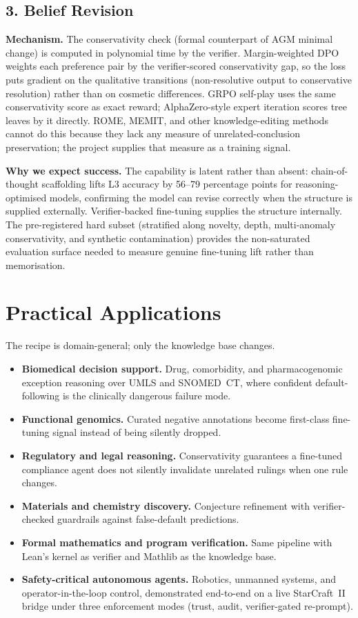 \documentclass[11pt]{article}
\begin{document}
\subsection*{3. Belief Revision}

\textbf{Mechanism.} The conservativity check (formal counterpart of AGM minimal change) is computed in polynomial time by the verifier. Margin-weighted DPO weights each preference pair by the verifier-scored conservativity gap, so the loss puts gradient on the qualitative transitions (non-resolutive output to conservative resolution) rather than on cosmetic differences. GRPO self-play uses the same conservativity score as exact reward; AlphaZero-style expert iteration scores tree leaves by it directly. ROME, MEMIT, and other knowledge-editing methods cannot do this because they lack any measure of unrelated-conclusion preservation; the project supplies that measure as a training signal.

\textbf{Why we expect success.} The capability is latent rather than absent: chain-of-thought scaffolding lifts L3 accuracy by 56--79 percentage points for reasoning-optimised models, confirming the model can revise correctly when the structure is supplied externally. Verifier-backed fine-tuning supplies the structure internally. The pre-registered hard subset (stratified along novelty, depth, multi-anomaly conservativity, and synthetic contamination) provides the non-saturated evaluation surface needed to measure genuine fine-tuning lift rather than memorisation.

\section*{Practical Applications}

The recipe is domain-general; only the knowledge base changes.

\begin{itemize}[nosep, leftmargin=1.4em]
    \item \textbf{Biomedical decision support.} Drug, comorbidity, and pharmacogenomic exception reasoning over UMLS and SNOMED~CT, where confident default-following is the clinically dangerous failure mode.
    \item \textbf{Functional genomics.} Curated negative annotations become first-class fine-tuning signal instead of being silently dropped.
    \item \textbf{Regulatory and legal reasoning.} Conservativity guarantees a fine-tuned compliance agent does not silently invalidate unrelated rulings when one rule changes.
    \item \textbf{Materials and chemistry discovery.} Conjecture refinement with verifier-checked guardrails against false-default predictions.
    \item \textbf{Formal mathematics and program verification.} Same pipeline with Lean's kernel as verifier and Mathlib as the knowledge base.
    \item \textbf{Safety-critical autonomous agents.} Robotics, unmanned systems, and operator-in-the-loop control, demonstrated end-to-end on a live StarCraft~II bridge under three enforcement modes (trust, audit, verifier-gated re-prompt).
\end{itemize}
\end{document}
